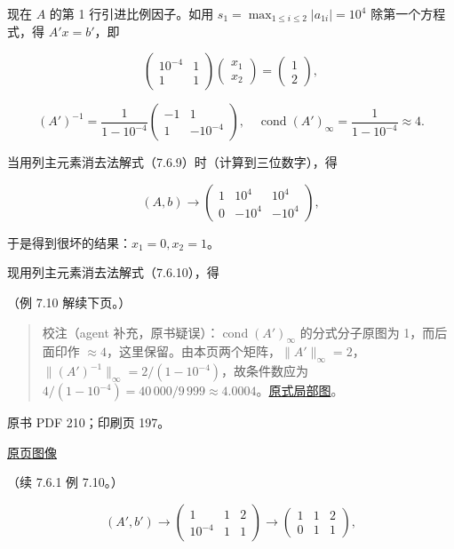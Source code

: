 \documentclass[
  10pt,
  fontset=fandol]{ctexart}
\begin{document}
现在 \(A\) 的第 1 行引进比例因子。如用
\(s_1=\max_{1\leqslant i\leqslant2}|a_{1i}|=10^4\) 除第一个方程式，得
\(A'x=b'\)，即

\[
\begin{pmatrix}10^{-4}&1\\1&1\end{pmatrix}
\begin{pmatrix}x_1\\x_2\end{pmatrix}
=\begin{pmatrix}1\\2\end{pmatrix},
\tag{7.6.10}
\]

\[
(A')^{-1}=\frac1{1-10^{-4}}\begin{pmatrix}-1&1\\1&-10^{-4}\end{pmatrix},\quad
\operatorname{cond}(A')_\infty=\frac1{1-10^{-4}}\approx4.
\]

当用列主元素消去法解式（7.6.9）时（计算到三位数字），得

\[
(A,b)\longrightarrow
\left(\begin{array}{cc|c}
1&10^4&10^4\\
0&-10^4&-10^4
\end{array}\right),
\]

于是得到很坏的结果：\(x_1=0,x_2=1\)。

现用列主元素消去法解式（7.6.10），得

（例 7.10 解续下页。）

\begin{quote}
校注（agent 补充，原书疑误）：\(\operatorname{cond}(A')_\infty\)
的分式分子原图为 1，而后面印作
\(\approx4\)，这里保留。由本页两个矩阵，\(\|A'\|_\infty=2\)，\(\|(A')^{-1}\|_\infty=2/(1-10^{-4})\)，故条件数应为
\(4/(1-10^{-4})=40\,000/9\,999\approx4.0004\)。\href{/Users/xiangjunfeng/Desktop/数值计算专用/numerical-analysis/book/staging/ch07b/assets/209-scaled-cond.png}{原式局部图}。
\end{quote}

\clearpage

原书 PDF 210；印刷页 197。

\href{/Users/xiangjunfeng/Desktop/数值计算专用/numerical-analysis/book/source-images/pdf-210.jpeg}{原页图像}

（续 7.6.1 例 7.10。）

\[
(A',b')\longrightarrow
\left(\begin{array}{cc|c}1&1&2\\10^{-4}&1&1\end{array}\right)
\longrightarrow
\left(\begin{array}{cc|c}1&1&2\\0&1&1\end{array}\right),
\]
\end{document}

